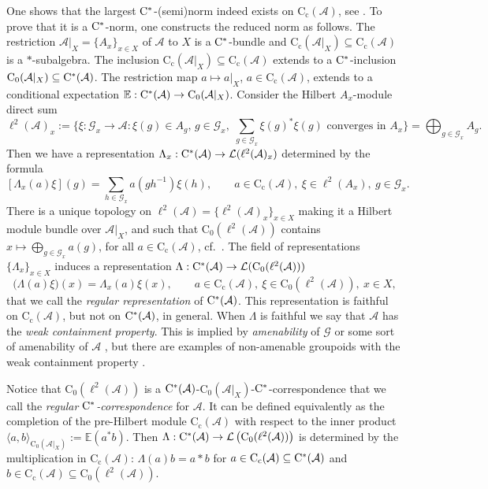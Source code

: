 \documentclass[11 pt, leqno]{amsart}
\numberwithin{equation}{section}
\theoremstyle{plain}
\theoremstyle{definition}
\newcommand*{\contc}{\mathrm{C_c}}%
\newcommand*{\contz}{\mathrm{C_0}}%
\newcommand{\LL}{\mathcal L}
\newcommand{\G}{\mathcal G} %
\newcommand{\A}{\mathcal A}
\newcommand{\E}{\mathbb E}
\newcommand{\cst}{\ifmmode\mathrm{C}^*\else{$\mathrm{C}^*$}\fi}
\begin{document}
One shows that the largest $\cst$-(semi)norm indeed exists on $\contc(\A)$, see \cite{BussExel0}. 
To prove that it is a $\cst$-norm, one constructs the reduced norm as follows. 
The restriction $\A|_X = \{ A_x \}_{x\in X}$ of $\A$ to $X$ is a $\cst$-bundle and $\contc(\A|_X)\subseteq \contc(\A)$ is a $*$-subalgebra. 
The inclusion $\contc(\A|_X)\subseteq \contc(\A)$ extends to a $\cst$-inclusion $\contz(\A|_X)\subseteq \cst(\A)$. 
The restriction map $a \mapsto a|_{X}$, $a\in \contc(\A)$, extends to a conditional expectation $\mathbb{E}: \cst(\A)\to \contz(\A|_X)$. 
Consider the Hilbert $A_{x}$-module direct sum
\[
    \ell^2(\A)_x:=\Big\{\xi:\G_x\to \A: \xi(g)\in A_g,\, g \in \G_x,\; \sum_{g \in \G_x} \xi(g)^*\xi(g) \text{ converges in $A_x$} \Big\} = \bigoplus_{g \in \G_x} A_g.
\]
Then we have a representation $\Lambda_x:\cst(\A) \to \LL(\ell^2(\A)_x)$ determined by the formula
\[
    [\Lambda_x(a) \xi ](g) = \sum_{h \in \G_x} a(g h^{-1}) \xi (h), \qquad a \in \contc(\A),\ \xi \in \ell^2(A_x),\ g \in \G_x .
\]
There is a unique topology on $\ell^2(\A) = \{\ell^2(\A)_x\}_{x\in X}$ making it a Hilbert module bundle over $\A|_{X}$, and such that $\contz(\ell^2(\A))$ contains  $x\mapsto \bigoplus_{g \in \G_x} a(g)$, for all $a\in \contc(\A)$, cf.\ \cite[3.3]{Kumjian}. 
The field of representations $\{\Lambda_{x}\}_{x\in X}$ induces a representation $\Lambda:\cst(\A)\to \LL ( \contz(\ell^2(\A)) )$ 
\[
    \big( \Lambda(a)\xi \big) (x) = \Lambda_x(a)\xi(x) , \qquad  a\in \contc(\A) , \ \xi\in \contz(\ell^2(\A)), \ x\in X,
\]
that  we call the \emph{regular representation} of $\cst(\A)$. 
This representation is faithful on $\contc(\A)$, but not on $\cst(\A)$, in general. 
When $\Lambda$ is faithful we say that $\A$ has the \emph{weak containment property}. 
This is implied by \emph{amenability} of $\G$ \cite{Sims_Williams} or some sort of amenability of $\A$ \cite{Kranz, BussMartinez}, but there are examples of non-amenable groupoids with the weak containment property \cite{Willett}.

Notice that $\contz(\ell^2(\A))$ is a $\cst(\A)$-$\contz(\A|_X)$-$\cst$-correspondence that we call the \emph{regular $\cst$-correspondence} for $\A$. 
It can be defined equivalently as the completion of the pre-Hilbert module $\contc(\A)$ with respect to the inner product $\langle a, b\rangle_{\contz(\A|_X)} := \E(a^*b)$. 
Then $\Lambda:\cst(\A)\to \LL\left(\contz(\ell^2(\A))\right)$ is determined by the multiplication in $\contc(\A)$: $\Lambda(a)b=a*b$  for $a \in \contc(\A)\subseteq \cst(\A)$ and $b\in \contc(\A)\subseteq  \contz(\ell^2(\A))$. 
\end{document}
